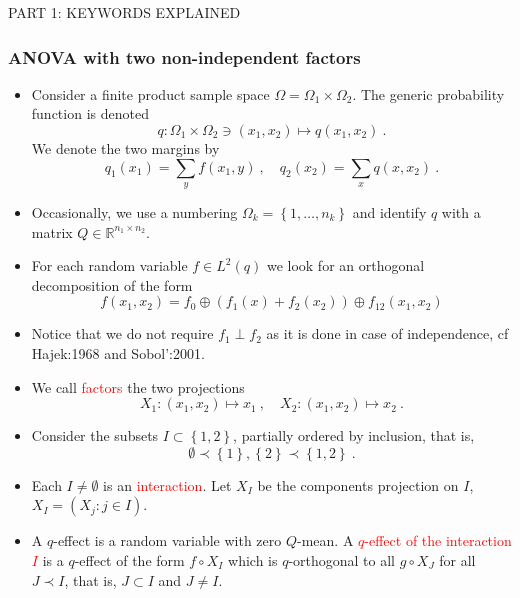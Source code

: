\documentclass[xcolor=svgnames]{beamer}
\newcommand{\reals}{\mathbb{R}}
\newcommand{\rosso}[1]{\textcolor{red}{#1}}
\newcommand{\set}[1]{\left\{#1\right\}}
\renewcommand{\emph}{\rosso}
\begin{document}
\begin{frame}

\huge PART 1: KEYWORDS EXPLAINED
    
\end{frame}

    \begin{frame}\small\frametitle{ANOVA with two non-independent factors}

    \begin{itemize}
    \item Consider a finite product sample space $\Omega = \Omega_1 \times \Omega_2$. The generic probability function is denoted
    \begin{equation*}
       q \colon  \Omega_1 \times \Omega _2 \ni (x_1,x_2) \mapsto q(x_1,x_2) \ . 
    \end{equation*}
    We denote the two margins by 
    \begin{equation*}
    q_1(x_1) = \sum_y f(x_1,y) \ , \quad q_2(x_2) = \sum_x q(x,x_2) \ .
    \end{equation*}
    \item Occasionally, we use a numbering $\Omega_k = \set{1,\dots,n_k}$ and identify $q$ with a matrix $Q \in \reals^{n_1 \times n_2}$.
    \item For each random variable $f \in L^2(q)$ we look for an orthogonal decomposition of the form
    \begin{equation*}
        f(x_1,x_2) = f_0 \oplus (f_1(x) + f_2(x_2)) \oplus f_{12}(x_1,x_2)
    \end{equation*}
    \item Notice that we do not require $f_1 \perp f_2$ as it is done in case of independence, cf Hajek:1968 and Sobol':2001.
    \item We call \emph{factors} the two projections \begin{equation*}
    X_1 \colon (x_1,x_2) \mapsto x_1 \ , \quad X_2 \colon (x_1,x_2) \mapsto x_2 \ .  
    \end{equation*}
  \item Consider the subsets $I \subset \set{1,2}$, partially ordered by inclusion, that is, 
\begin{equation*}\emptyset \prec \set{1},\set{2} \prec \set{1,2} \ .
\end{equation*}
\item  Each $I \neq \emptyset$ is an \emph{interaction}. 
   Let $X_I$ be the components projection on $I$, $X_I = (X_j \colon j \in I)$.
    \item A $q$-effect is a random variable with zero $Q$-mean. A \emph{$q$-effect of the interaction $I$} is a $q$-effect of the form $f\circ X_I$ which is $q$-orthogonal to all $g \circ X_J$ for all $J \prec I$, that is, $J \subset I$ and $J \neq I$.

\end{itemize}
\end{frame}
\end{document}
